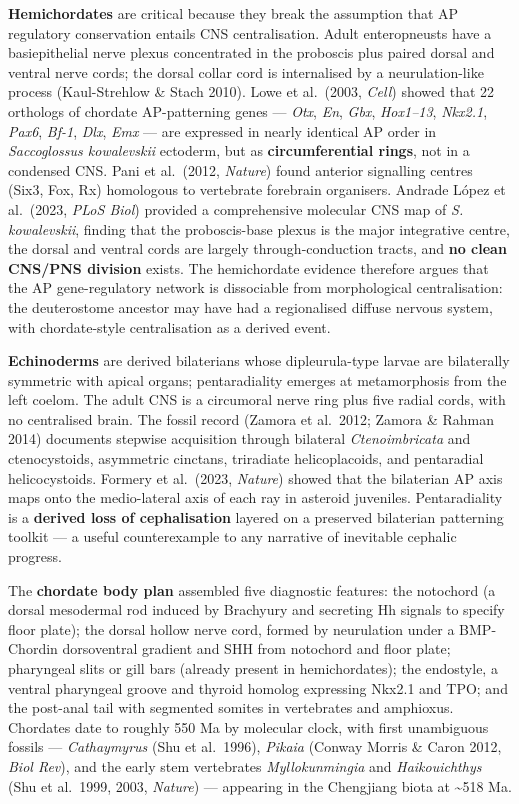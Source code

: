 \textbf{Hemichordates} are critical because they break the assumption that AP regulatory conservation entails CNS centralisation. Adult enteropneusts have a basiepithelial nerve plexus concentrated in the proboscis plus paired dorsal and ventral nerve cords; the dorsal collar cord is internalised by a neurulation-like process (Kaul-Strehlow \& Stach 2010). Lowe et al.~(2003, \emph{Cell}) showed that 22 orthologs of chordate AP-patterning genes --- \emph{Otx}, \emph{En}, \emph{Gbx}, \emph{Hox1--13}, \emph{Nkx2.1}, \emph{Pax6}, \emph{Bf-1}, \emph{Dlx}, \emph{Emx} --- are expressed in nearly identical AP order in \emph{Saccoglossus kowalevskii} ectoderm, but as \textbf{circumferential rings}, not in a condensed CNS. Pani et al.~(2012, \emph{Nature}) found anterior signalling centres (Six3, Fox, Rx) homologous to vertebrate forebrain organisers. Andrade López et al.~(2023, \emph{PLoS Biol}) provided a comprehensive molecular CNS map of \emph{S. kowalevskii}, finding that the proboscis-base plexus is the major integrative centre, the dorsal and ventral cords are largely through-conduction tracts, and \textbf{no clean CNS/PNS division} exists. The hemichordate evidence therefore argues that the AP gene-regulatory network is dissociable from morphological centralisation: the deuterostome ancestor may have had a regionalised diffuse nervous system, with chordate-style centralisation as a derived event.

\textbf{Echinoderms} are derived bilaterians whose dipleurula-type larvae are bilaterally symmetric with apical organs; pentaradiality emerges at metamorphosis from the left coelom. The adult CNS is a circumoral nerve ring plus five radial cords, with no centralised brain. The fossil record (Zamora et al.~2012; Zamora \& Rahman 2014) documents stepwise acquisition through bilateral \emph{Ctenoimbricata} and ctenocystoids, asymmetric cinctans, triradiate helicoplacoids, and pentaradial helicocystoids. Formery et al.~(2023, \emph{Nature}) showed that the bilaterian AP axis maps onto the medio-lateral axis of each ray in asteroid juveniles. Pentaradiality is a \textbf{derived loss of cephalisation} layered on a preserved bilaterian patterning toolkit --- a useful counterexample to any narrative of inevitable cephalic progress.

The \textbf{chordate body plan} assembled five diagnostic features: the notochord (a dorsal mesodermal rod induced by Brachyury and secreting Hh signals to specify floor plate); the dorsal hollow nerve cord, formed by neurulation under a BMP-Chordin dorsoventral gradient and SHH from notochord and floor plate; pharyngeal slits or gill bars (already present in hemichordates); the endostyle, a ventral pharyngeal groove and thyroid homolog expressing Nkx2.1 and TPO; and the post-anal tail with segmented somites in vertebrates and amphioxus. Chordates date to roughly 550 Ma by molecular clock, with first unambiguous fossils --- \emph{Cathaymyrus} (Shu et al.~1996), \emph{Pikaia} (Conway Morris \& Caron 2012, \emph{Biol Rev}), and the early stem vertebrates \emph{Myllokunmingia} and \emph{Haikouichthys} (Shu et al.~1999, 2003, \emph{Nature}) --- appearing in the Chengjiang biota at \textasciitilde518 Ma.

